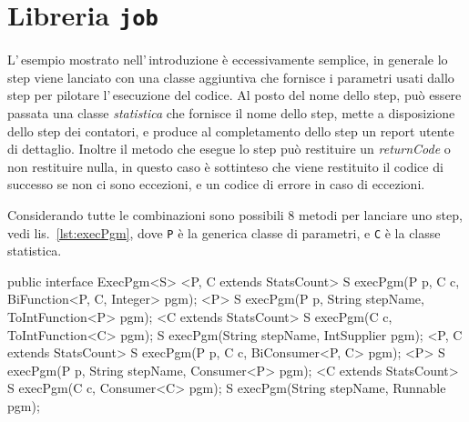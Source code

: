\chapter{Libreria \texttt{job}}

L'\,esempio mostrato nell'\,introduzione è eccessivamente semplice, in generale
lo step viene lanciato con una classe aggiuntiva che fornisce i parametri usati
dallo step per pilotare l'\,esecuzione del codice.
Al posto del nome dello step, può essere passata una classe \textsl{statistica}
che fornisce il nome dello step, mette a disposizione dello step dei contatori,
e produce al completamento dello step un report utente di dettaglio.
Inoltre il metodo che esegue lo step può restituire un \textsl{returnCode} o
non restituire nulla, in questo caso è sottinteso che viene restituito il codice
di successo se non ci sono eccezioni, e un codice di errore in caso di
eccezioni.

Considerando tutte le combinazioni sono possibili 8 metodi per lanciare uno
step, vedi lis.~\ref{lst:execPgm}, dove \texttt{P} è la generica classe di
parametri, e \texttt{C} è la classe statistica.
\begin{elisting}[!htb]
\begin{javacode}
public interface ExecPgm<S> {
    <P, C extends StatsCount> S execPgm(P p, C c, BiFunction<P, C, Integer> pgm);
    <P> S execPgm(P p, String stepName, ToIntFunction<P> pgm);
    <C extends StatsCount> S execPgm(C c, ToIntFunction<C> pgm);
    S execPgm(String stepName, IntSupplier pgm);
    <P, C extends StatsCount> S execPgm(P p, C c, BiConsumer<P, C> pgm);
    <P> S execPgm(P p, String stepName, Consumer<P> pgm);
    <C extends StatsCount> S execPgm(C c, Consumer<C> pgm);
    S execPgm(String stepName, Runnable pgm);
}
\end{javacode}
\caption{Interfaccia con i metodi di esecuzione di un programma (step)}
\label{lst:execPgm}
\end{elisting}

